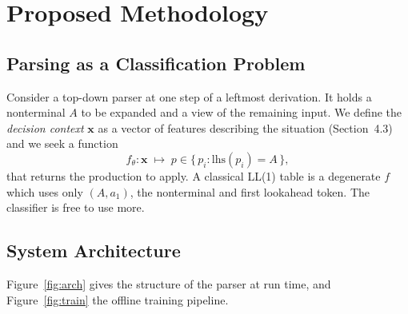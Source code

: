 \documentclass[12pt,a4paper]{article}
\begin{document}
\newpage
\section{Proposed Methodology}

\subsection{Parsing as a Classification Problem}

Consider a top-down parser at one step of a leftmost derivation. It holds a
nonterminal $A$ to be expanded and a view of the remaining input. We define the
\emph{decision context} $\mathbf{x}$ as a vector of features describing the
situation (Section~4.3) and we seek a function
\begin{equation}
f_\theta:\mathbf{x}\;\longmapsto\;p\in\{\,p_i : \mathrm{lhs}(p_i)=A\,\},
\end{equation}
that returns the production to apply. A classical LL(1) table is a degenerate
$f$ which uses only $(A,a_1)$, the nonterminal and first lookahead token. The
classifier is free to use more.

\subsection{System Architecture}

Figure~\ref{fig:arch} gives the structure of the parser at run time, and
Figure~\ref{fig:train} the offline training pipeline.
\end{document}
